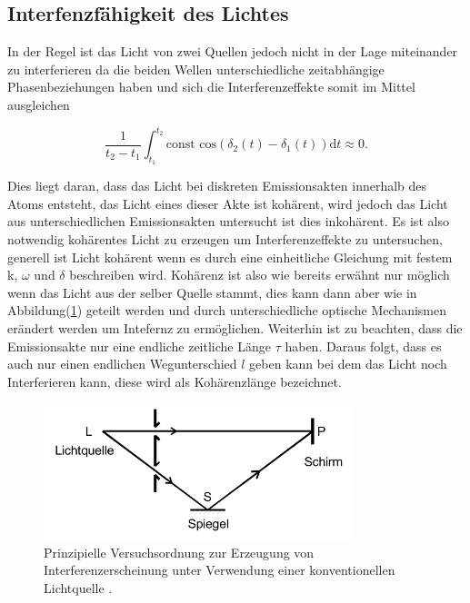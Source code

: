     \subsection{Interfenzfähigkeit des Lichtes}

        \noindent In der Regel ist das Licht von zwei Quellen jedoch nicht in der Lage miteinander zu interferieren da die beiden Wellen 
        unterschiedliche zeitabhängige Phasenbeziehungen haben und sich die Interferenzeffekte somit im Mittel ausgleichen

        \begin{equation}
            \frac{1}{t_2 - t_1} \int_{t_1}^{t_2} \text{const cos}(\delta_2(t)-\delta_1(t)) \text{d}t \approx 0 .
        \end{equation}
        
        \noindent Dies liegt daran, dass das Licht bei diskreten Emissionsakten innerhalb des Atoms entsteht, das Licht eines dieser Akte 
        ist kohärent, wird jedoch das Licht aus unterschiedlichen Emissionsakten untersucht ist dies inkohärent.
        Es ist also notwendig kohärentes Licht zu erzeugen um Interferenzeffekte zu untersuchen, generell ist Licht kohärent wenn es durch 
        eine einheitliche Gleichung mit festem k, $\omega$ und $\delta$ beschreiben wird. Kohärenz ist also wie bereits erwähnt nur möglich wenn 
        das Licht aus der selber Quelle stammt, dies kann dann aber wie in Abbildung(\ref{img:konv}) geteilt werden und durch unterschiedliche optische 
        Mechanismen erändert werden um Intefernz zu ermöglichen. Weiterhin ist zu beachten, dass die Emissionsakte nur eine endliche 
        zeitliche Länge $\tau$ haben. Daraus folgt, dass es auch nur einen endlichen Wegunterschied $l$ geben kann bei dem das Licht noch 
        Interferieren kann, diese wird als Kohärenzlänge bezeichnet.
        
        \begin{figure}[ht]
            \centering
            \includegraphics[width=0.8\textwidth]{latex/images/konvenL.PNG}
            \caption{Prinzipielle Versuchsordnung zur Erzeugung von Interferenzerscheinung unter Verwendung einer konventionellen 
            Lichtquelle \protect \cite{V401}.}
            \label{img:konv}
        \end{figure}

